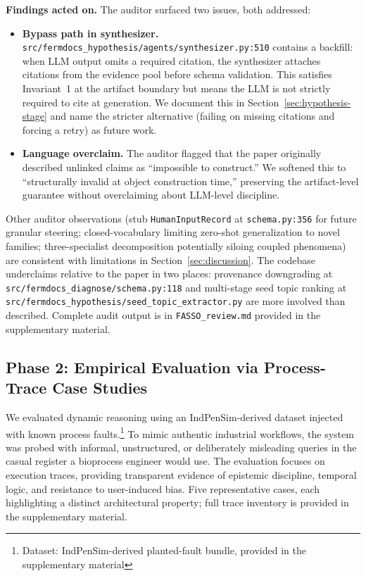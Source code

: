 \documentclass[11pt]{article}
\begin{document}
\textbf{Findings acted on.} The auditor surfaced two issues, both addressed:
\begin{itemize}[leftmargin=*, noitemsep]
\item \textbf{Bypass path in synthesizer.} \texttt{src/fermdocs\_hypothesis/agents/synthesizer.py:510} contains a backfill: when LLM output omits a required citation, the synthesizer attaches citations from the evidence pool before schema validation. This satisfies Invariant~1 at the artifact boundary but means the LLM is not strictly required to cite at generation. We document this in Section~\ref{sec:hypothesis-stage} and name the stricter alternative (failing on missing citations and forcing a retry) as future work.
\item \textbf{Language overclaim.} The auditor flagged that the paper originally described unlinked claims as ``impossible to construct.'' We softened this to ``structurally invalid at object construction time,'' preserving the artifact-level guarantee without overclaiming about LLM-level discipline.
\end{itemize}

Other auditor observations (stub \texttt{HumanInputRecord} at \texttt{schema.py:356} for future granular steering; closed-vocabulary limiting zero-shot generalization to novel families; three-specialist decomposition potentially siloing coupled phenomena) are consistent with limitations in Section~\ref{sec:discussion}. The codebase underclaims relative to the paper in two places: provenance downgrading at \texttt{src/fermdocs\_diagnose/schema.py:118} and multi-stage seed topic ranking at \texttt{src/fermdocs\_hypothesis/seed\_topic\_extractor.py} are more involved than described. Complete audit output is in \texttt{FASSO\_review.md} provided in the supplementary material.

\subsection{Phase 2: Empirical Evaluation via Process-Trace Case Studies}
\label{subsec:phase2}

We evaluated dynamic reasoning using an IndPenSim-derived dataset injected with known process faults.\footnote{Dataset: IndPenSim-derived planted-fault bundle, provided in the supplementary material} To mimic authentic industrial workflows, the system was probed with informal, unstructured, or deliberately misleading queries in the casual register a bioprocess engineer would use. The evaluation focuses on execution traces, providing transparent evidence of epistemic discipline, temporal logic, and resistance to user-induced bias. Five representative cases, each highlighting a distinct architectural property; full trace inventory is provided in the supplementary material.
\end{document}
